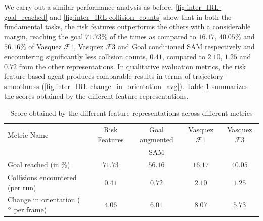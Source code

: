 
We carry out a similar performance analysis as before. \autoref{fig:inter_IRL-goal_reached} and \autoref{fig:inter_IRL-collision_counts} show that in both the fundamental tasks, the risk features outperforms the others with a considerable margin, reaching the goal $71.73\%$ of the times as compared to $16.17$, $40.05\%$ and $56.16\%$ of Vasquez $\mathcal{F}1$, Vasquez $\mathcal{F}3$ and Goal conditioned SAM respectively and encountering significantly less collision counts, $0.41$, compared to $2.10$, $1.25$ and $0.72$ from the other  representations. In qualitative evaluation metrics, the risk feature based agent produces comparable results in terms of trajectory smoothness (\autoref{fig:inter_IRL-change_in_orientation_avg}). %
Table \ref{tab:inter_irl_numerical_comparison} summarizes the scores obtained by the different feature representations.
\begin{table}[htbp]
	\begin{center}
		\renewcommand{\arraystretch}{1.5}
		\begin{tabular}{|p{2.5cm}|c|c|c|c|}
			\hline
			Metric Name & Risk Features & Goal augmented  & Vasquez $\mathcal{F}1$ & Vasquez $\mathcal{F}3$\\
			  &   & SAM  &  &  \\
			\hline
			Goal reached (in $\%$) & $71.73$ & $56.16$ & $16.17$ & $40.05$ \\
			Collisions encountered (per run) & $0.41$ & $0.72$ & $2.10$ & $1.25$\\
			Change in orientation ( $\degree$ per frame) & $4.06$ & $6.01$ &  $8.07$ & $ 5.73$\\
			\hline
		\end{tabular}
	\end{center}
	\caption{Score obtained by the different feature representations across different metrics}
	\label{tab:inter_irl_numerical_comparison}
\end{table}\\


